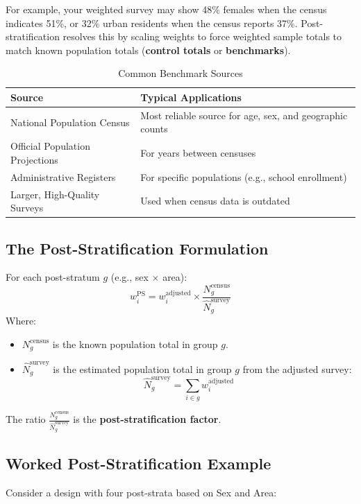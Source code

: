 \documentclass[11pt,a4paper]{article}
\begin{document}
For example, your weighted survey may show 48\% females when the census indicates 51\%, or 32\% urban residents when the census reports 37\%. Post-stratification resolves this by scaling weights to force weighted sample totals to match known population totals (\textbf{control totals} or \textbf{benchmarks}).

\begin{table}[htbp]
  \centering
  \caption{Common Benchmark Sources}
  \label{tab:benchmarks}
  \begin{tabularx}{\textwidth}{lX}
    \toprule
    \textbf{Source} & \textbf{Typical Applications} \\
    \midrule
    National Population Census & Most reliable source for age, sex, and geographic counts \\
    Official Population Projections & For years between censuses \\
    Administrative Registers & For specific populations (e.g., school enrollment) \\
    Larger, High-Quality Surveys & Used when census data is outdated \\
    \bottomrule
  \end{tabularx}
\end{table}

\subsection{The Post-Stratification Formulation}
For each post-stratum $g$ (e.g., sex $\times$ area):
\begin{equation}
  w_i^{\text{PS}} = w_i^{\text{adjusted}} \times \frac{N_g^{\text{census}}}{\hat{N}_g^{\text{survey}}}
\end{equation}
Where:
\begin{itemize}
  \item $N_g^{\text{census}}$ is the known population total in group $g$.
  \item $\hat{N}_g^{\text{survey}}$ is the estimated population total in group $g$ from the adjusted survey:
  \begin{equation}
    \hat{N}_g^{\text{survey}} = \sum_{i \in g} w_i^{\text{adjusted}}
  \end{equation}
\end{itemize}
The ratio $\frac{N_g^{\text{census}}}{\hat{N}_g^{\text{survey}}}$ is the \textbf{post-stratification factor}.

\subsection{Worked Post-Stratification Example}
Consider a design with four post-strata based on Sex and Area:
\end{document}
